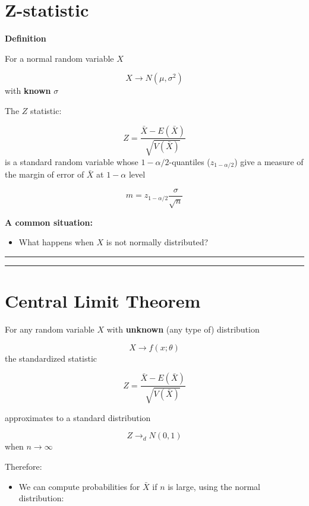 \documentclass[
]{book}
\providecommand{\tightlist}{%
  \setlength{\itemsep}{0pt}\setlength{\parskip}{0pt}}
\begin{document}
\hypertarget{z-statistic-2}{%
\section{Z-statistic}\label{z-statistic-2}}

\textbf{Definition}

For a normal random variable \(X\)

\[X \rightarrow N(\mu, \sigma^2)\] with \textbf{known} \(\sigma\)

The \(Z\) statistic:

\[Z=\frac{\bar{X}-E(\bar{X})}{\sqrt{V(\bar{X})}}\]
is a standard random variable whose \(1-\alpha/2\)-quantiles (\(z_{1-\alpha/2}\)) give a measure of the margin of error of \(\bar{X}\) at \(1-\alpha\) level

\[m=z_{1-\alpha/2}\frac{\sigma}{\sqrt{n}}\]

\textbf{A common situation:}

\begin{itemize}
\tightlist
\item
  What happens when \(X\) is not normally distributed?
\end{itemize}

\begin{center}\rule{0.5\linewidth}{0.5pt}\end{center}

\begin{center}\rule{0.5\linewidth}{0.5pt}\end{center}

\hypertarget{central-limit-theorem-1}{%
\section{Central Limit Theorem}\label{central-limit-theorem-1}}

For any random variable \(X\) with \textbf{unknown} (any type of) distribution

\[X \rightarrow f(x; \theta)\]
the standardized statistic

\[Z=\frac{\bar{X}-E(\bar{X})}{\sqrt{V(\bar{X})}}\]

approximates to a standard distribution

\[Z \rightarrow_d N(0,1)\] when \(n\rightarrow \infty\)

Therefore:

\begin{itemize}
\tightlist
\item
  We can compute probabilities for \(\bar{X}\) if \(n\) is large, using the normal distribution:
\end{itemize}
\end{document}
